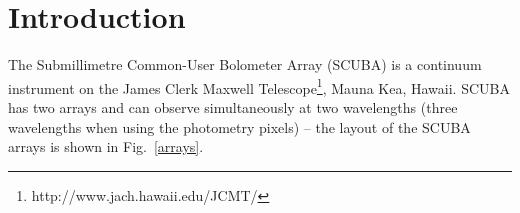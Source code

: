\documentclass[twoside,11pt]{article}
\newcommand{\htmladdnormallinkfoot}[2]{#1\footnote{#2}}
\newcommand{\xlabel}[1]{}
\begin{document}
\begin{htmlonly}
   \renewcommand{\sstexamples}[1]{
      \item[Examples:]
      \begin{description}
         #1
      \end{description}
   }
 
   \renewcommand{\sstsubsection}[1]{\item[{#1}]}
 
   \renewcommand{\sstexamplesubsection}[2]{\item[{\ssttt #1}] \\ #2}
 
   \renewcommand{\sstnotes}[1]{\item[Notes:]
      \begin{description}
         #1
      \end{description}
   }
 
   \renewcommand{\sstdiytopic}[2]{\item[{#1}]
      \begin{description}
         #2
      \end{description}
   }
 
   \renewcommand{\sstimplementationstatus}[1]{\item[Implementation Status:]
      \begin{description}
         #1
      \end{description}
   }
 
   \newcommand{\sstitemlist}[1]{
      \begin{itemize}
         #1
      \end{itemize}
   }
\end{htmlonly}
 

\section{\xlabel{introduction}Introduction\label{introduction}}

The Submillimetre Common-User Bolometer Array (SCUBA) is a continuum
instrument on the \htmladdnormallinkfoot{James Clerk Maxwell
Telescope}{http://www.jach.hawaii.edu/JCMT/}, Mauna Kea, Hawaii.  SCUBA has two
arrays and can observe simultaneously at two wavelengths (three wavelengths
when using the photometry pixels) -- the layout of the SCUBA arrays is shown
in Fig.\ \ref{arrays}.
\end{document}
